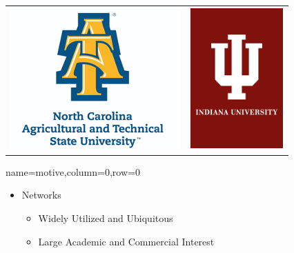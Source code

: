 \documentclass[landscape,paperwidth=70in,paperheight=46in,fontscale=0.225]{baposter} %
\begin{document}
\begin{poster}
{\begin{tabular}{c c}
\includegraphics[scale=0.4]{logos/ncatnt.png} &
\includegraphics[scale=0.4]{logos/iu.png} \\
\end{tabular}
}

\vspace{-2.5in} %


          {name=motive,column=0,row=0}{
{
\begin{minipage}{.6\textwidth}
       
\begin{itemize}[leftmargin=*,noitemsep,topsep=0pt]
\item Networks
	\begin{itemize}
	\item Widely Utilized and Ubiquitous
	\item Large Academic and Commercial Interest
	\end{itemize}


\end{itemize}
\end{minipage}}}
\end{poster}
\end{document}

